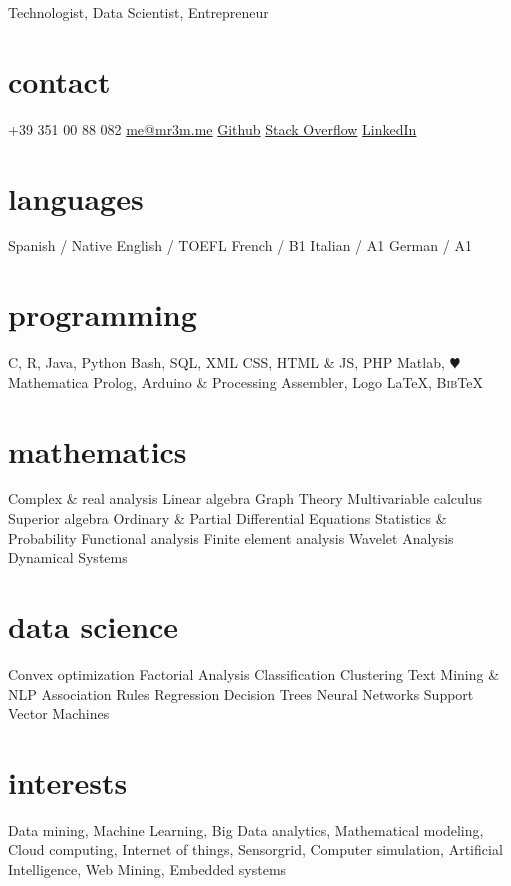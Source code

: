 \documentclass[]{friggeri-cv}
\begin{document}
       {Technologist, Data Scientist, Entrepreneur}


\begin{aside}
  \section{contact}
    +39 351 00 88 082
    \href{mailto:me@mr3m.me}{me@mr3m.me}
    \href{https://github.com/mr3m}{Github}
    \href{http://stackoverflow.com/cv/mr3m}{Stack Overflow}
    \href{https://fr.linkedin.com/in/carloslopezroa}{LinkedIn}
  \section{languages}
    Spanish / Native
    English / TOEFL
    French / B1
    Italian / A1
    German / A1
  \section{	programming}
    C, R, Java, Python
    Bash, SQL, XML
    CSS, HTML \& JS, PHP
    Matlab, {\color{red} $\varheartsuit$} Mathematica
    Prolog, %
    Arduino \& Processing
    Assembler, Logo
    \LaTeX{}, B\textsc{ib}\TeX{}
   \section{mathematics}  
   Complex \& real analysis
   Linear algebra
   Graph Theory
   Multivariable calculus
   Superior algebra
   Ordinary \& Partial Differential Equations
   Statistics \& Probability
   Functional analysis
   Finite element analysis
   Wavelet Analysis
   Dynamical Systems
   \section{data science}
   Convex optimization
   Factorial Analysis
   Classification
   Clustering
   Text Mining \& NLP
   Association Rules
   Regression
   Decision Trees
   Neural Networks
   Support Vector Machines
\end{aside}

\section{interests}

Data mining, Machine Learning, Big Data analytics, Mathematical modeling, Cloud computing, Internet of things, Sensorgrid,  Computer simulation,   Artificial Intelligence, Web Mining, Embedded systems
\end{document}
